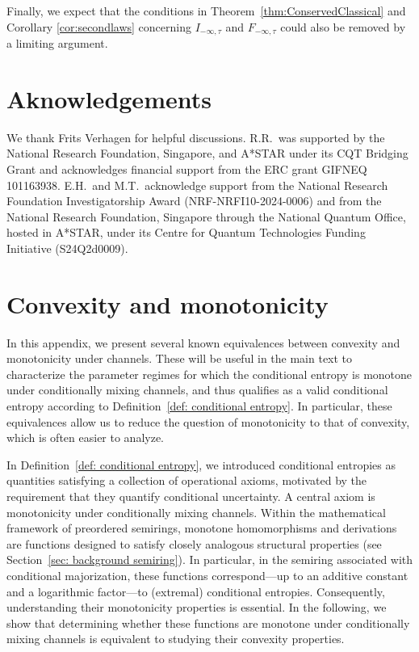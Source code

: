 \documentclass[aps,pra,11pt,onecolumn,nofootinbib,tightenlines]{revtex4-2}
\theoremstyle{definition}
\begin{document}
Finally, we expect that the conditions in Theorem~\ref{thm:ConservedClassical} and Corollary \ref{cor:secondlaws} concerning $I_{-\infty,\tau}$ and $F_{-\infty,\tau}$ could also be removed by a limiting argument.



\section{Aknowledgements}
We thank Frits Verhagen for helpful discussions. R.R.\ was supported by the National Research Foundation, Singapore, and A*STAR under its CQT Bridging Grant and acknowledges financial support from the ERC grant GIFNEQ 101163938. E.H.\ and M.T.\ acknowledge support from the National Research Foundation Investigatorship Award (NRF-NRFI10-2024-0006) and from the National Research Foundation, Singapore through the National Quantum Office, hosted in A*STAR, under its Centre for Quantum Technologies Funding Initiative (S24Q2d0009).



\newpage
\appendix

\section{Convexity and monotonicity}
\label{app: convexity and monotonicity}
In this appendix, we present several known equivalences between convexity and monotonicity under channels. These will be useful in the main text to characterize the parameter regimes for which the conditional entropy is monotone under conditionally mixing channels, and thus qualifies as a valid conditional entropy according to Definition~\ref{def: conditional entropy}. In particular, these equivalences allow us to reduce the question of monotonicity to that of convexity, which is often easier to analyze. 

In Definition~\ref{def: conditional entropy}, we introduced conditional entropies as quantities satisfying a collection of operational axioms, motivated by the requirement that they quantify conditional uncertainty. A central axiom is monotonicity under conditionally mixing channels.
Within the mathematical framework of preordered semirings, monotone homomorphisms and derivations are functions designed to satisfy closely analogous structural properties (see Section~\ref{sec: background semiring}). In particular, in the semiring associated with conditional majorization, these functions correspond—up to an additive constant and a logarithmic factor—to (extremal) conditional entropies.
Consequently, understanding their monotonicity properties is essential. In the following, we show that determining whether these functions are monotone under conditionally mixing channels is equivalent to studying their convexity properties.
\end{document}
